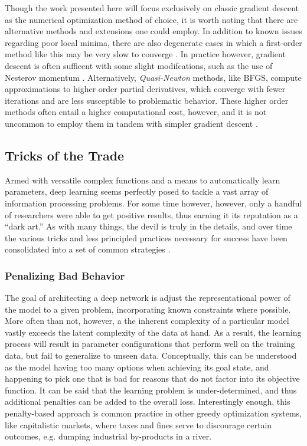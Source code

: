 Though the work presented here will focus exclusively on classic gradient descent as the numerical optimization method of choice, it is worth noting that there are alternative methods and extensions one could employ.
In addition to known issues regarding poor local minima, there are also degenerate cases in which a first-order method like this may be very slow to converge \cite{}.
In practice however, gradient descent is often sufficent with some slight modifcations, such as the use of Nesterov momentum \cite{}.
Alternatively, \emph{Quasi-Newton} methods, like BFGS, compute approximations to higher order partial derivatives, which converge with fewer iterations and are less susceptible to problematic behavior.
These higher order methods often entail a higher computational cost, however, and it is not uncommon to employ them in tandem with simpler gradient descent \cite{Koray}.


\subsection{Tricks of the Trade}
\label{subsec:tricks}

Armed with versatile complex functions and a means to automatically learn parameters, deep learning seems perfectly posed to tackle a vast array of information processing problems.
For some time however, however, only a handful of researchers were able to get positive results, thus earning it its reputation as a ``dark art.''
As with many things, the devil is truly in the details, and over time the various tricks and less principled practices necessary for success have been consolidated into a set of common strategies \cite{Bengio2012Practical}.

\subsubsection{Penalizing Bad Behavior}

The goal of architecting a deep network is adjust the representational power of the model to a given problem, incorporating known constraints where possible.
More often than not, however, a the inherent complexity of a particular model vastly exceeds the latent complexity of the data at hand.
As a result, the learning process will result in parameter configurations that perform well on the training data, but fail to generalize to unseen data.
Conceptually, this can be understood as the model having too many options when achieving its goal state, and happening to pick one that is bad for reasons that do not factor into its objective function.
It can be said that the learning problem is under-determined, and thus additional penalties can be added to the overall loss.
Interestingly enough, this penalty-based approach is common practice in other greedy optimization systems, like capitalistic markets, where taxes and fines serve to discourage certain outcomes, e.g. dumping industrial by-products in a river.

